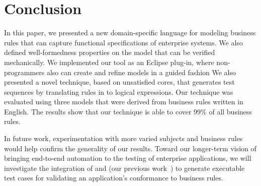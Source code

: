 \section{Conclusion}

In this paper, we presented a new domain-specific language for modeling business
rules that can capture functional specifications of enterprise systems. We also
defined well-formedness properties on the model that can be verified
mechanically. We implemented our tool as an Eclipse plug-in, where
non-programmers also can create and refine models in a guided fashion We also
presented a novel technique, based on unsatisfied cores, that generates test
sequences by translating rules in to logical expressions.
Our technique was evaluated using three models that were derived from business
rules written in English. The results show that our technique is able to cover
99\% of all business rules.

In future work, experimentation with more varied subjects and business rules
would help confirm the generality of our results. Toward our longer-term vision
of bringing end-to-end automation to the testing of enterprise applications, we
will investigate the integration of \tool{} and \wateg{} (our previous
work~\cite{Thummalapenta:2013}) to generate executable test cases for validating
an application's conformance to business rules.

